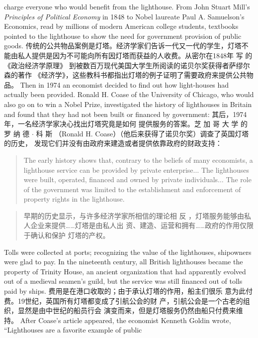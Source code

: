 \begin{paracol}{2}
charge everyone who would benefit from the lighthouse. From
John Stuart Mill's \textit{Principles of Political Economy} in 1848 to Nobel
laureate Paul A. Samuelson's Economics, read by millions of
modern American college students, textbooks pointed to the lighthouse to show the need for government provision of public
goods.
\switchcolumn
传统的公共物品案例是灯塔。经济学家们告诉一代又一代的学生，灯塔不能由私人提供是因为不可能向所有因灯塔而获益的人收费。从密尔在1848年 写 的 《政治经济学原理》 到被数百万现代美国大学生所阅读的诺贝尔奖获得者萨缪尔森的著作 《经济学》，这些教科书都指出灯塔的例子证明了需要政府来提供公共物品。
\switchcolumn*
Then in 1974 an economist decided to find out how light-houses had actually been provided. Ronald H. Coase of the University of Chicago, who would also go on to win a Nobel Prize,
investigated the history of lighthouses in Britain and found that
they had not been built or financed by government:
\switchcolumn
其后，1974年，一名经济学家决心找出灯塔究竟是如何
提供服务的答案。芝 加 哥 大 学 的 罗 纳 德 $\cdot$ 科 斯 （Ronald
H. Coase）（他后来获得了诺贝尔奖）调查了英国灯塔的历史，
发现它们并没有由政府来建造或者提供依靠政府的财政支持：
\switchcolumn*
\begin{quote}
The early history shows that, contrary to the beliefs of many
economists, a lighthouse service can be provided by private enterprise$\ldots$ The lighthouses were built, operated, financed and
owned by private individuals$\ldots$ The role of the government
was limited to the establishment and enforcement of property
rights in the lighthouse.
\end{quote}
\switchcolumn
\begin{quote}
早期的历史显示，与许多经济学家所相信的理论相
反 ，灯塔服务能够由私人企业来提供……灯塔是由私人出
资、建造、运营和拥有……政府的作用仅限于确认和保护
灯塔的产权。
\end{quote}
\switchcolumn*
Tolls were collected at ports; recognizing the value of the lighthouses, shipowners were glad to pay. In the nineteenth century,
all British lighthouses became the property of Trinity House, an
ancient organization that had apparently evolved out of a medieval seamen's guild, but the service was still financed out of
tolls paid by ships.
\switchcolumn
费用是在港口收取的；由于承认灯塔的作用，船主们很乐
意为此付费。19世纪，英国所有灯塔都变成了引航公会的财
产，引航公会是一个古老的组织，显然是由中世纪的船员行会
演变而来，但是灯塔服务仍然由船只付费来维持。
\switchcolumn*
After Coase's article appeared, the economist Kenneth
Goldin wrote, ``Lighthouses are a favorite example of public

\end{paracol}
